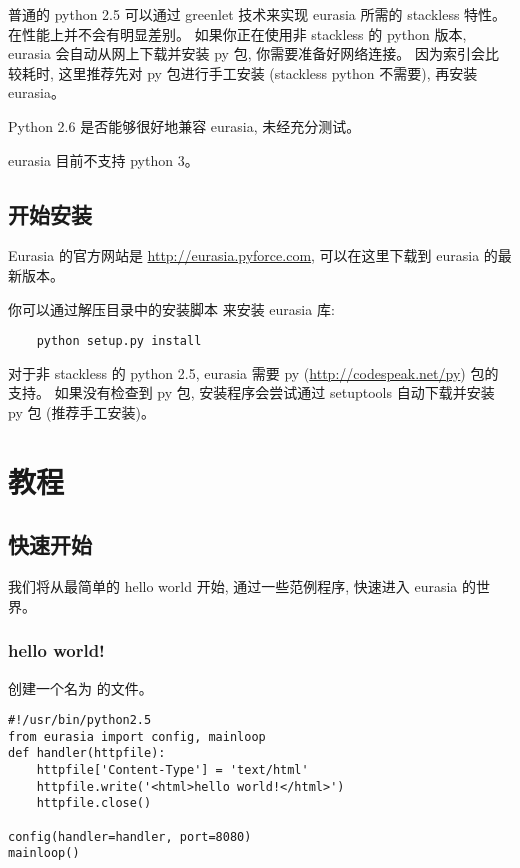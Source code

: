 \documentclass{manual}
\begin{document}

普通的 python 2.5 可以通过 greenlet 技术来实现 eurasia 所需的 stackless 特性。在性能上并不会有明显差别。
如果你正在使用非 stackless 的 python 版本, eurasia 会自动从网上下载并安装 py 包, 你需要准备好网络连接。
因为索引会比较耗时, 这里推荐先对 py 包进行手工安装 (stackless python 不需要), 再安装 eurasia。


Python 2.6 是否能够很好地兼容 eurasia, 未经充分测试。


eurasia 目前不支持 python 3。

\section{开始安装}

Eurasia 的官方网站是 \url{http://eurasia.pyforce.com}, 可以在这里下载到 eurasia 的最新版本。

你可以通过解压目录中的安装脚本  来安装 eurasia 库:

\begin{verbatim}
    python setup.py install
\end{verbatim}

对于非 stackless 的 python 2.5, eurasia 需要 py (\url{http://codespeak.net/py}) 包的支持。
如果没有检查到 py 包, 安装程序会尝试通过 setuptools 自动下载并安装 py 包 (推荐手工安装)。

\chapter{教程}

\section{快速开始}

我们将从最简单的 hello world 开始, 通过一些范例程序, 快速进入 eurasia 的世界。

\subsection{hello world!}

创建一个名为  的文件。

\begin{verbatim}
#!/usr/bin/python2.5
from eurasia import config, mainloop
def handler(httpfile):
	httpfile['Content-Type'] = 'text/html'
	httpfile.write('<html>hello world!</html>')
	httpfile.close()

config(handler=handler, port=8080)
mainloop()
\end{verbatim}
\end{document}

